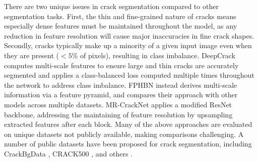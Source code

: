 \documentclass[a4paper,12pt]{report}
\begin{document}
There are two unique issues in crack segmentation compared to other segmentation tasks. First, the thin and fine-grained nature of cracks means especially dense features must be maintained throughout the model, as any reduction in feature resolution will cause major inaccuracies in fine crack shapes. Secondly, cracks typically make up a minority of a given input image even when they are present ($<5\%$ of pixels), resulting in class imbalance. DeepCrack \cite{liu_deepcrack_2019} computes multi-scale features to ensure large and thin cracks are accurately segmented and applies a class-balanced loss computed multiple times throughout the network to address class imbalance. FPHBN \cite{yang_feature_2019} instead derives multi-scale information via a feature pyramid, and compares their approach with other models across multiple datasets. MR-CrackNet \cite{nayyeri_multi-resolution_2021} applies a modified ResNet \cite{he_deep_2015} backbone, addressing the maintaining of feature resolution by upsampling extracted features after each block.
Many of the above approaches are evaluated on unique datasets not publicly available, making comparisons challenging. A number of public datasets have been proposed for crack segmentation, including CrackBgData \cite{nayyeri_multi-resolution_2021}, CRACK500 \cite{yang_feature_2019}, and others \cite{eisenbach_how_2017} \cite{shi_automatic_2016} \cite{amhaz_automatic_2016} \cite{zou_cracktree_2012}.
\end{document}

